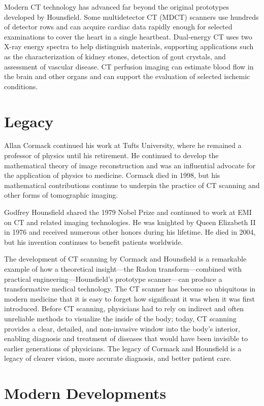 Modern CT technology has advanced far beyond the original prototypes developed by Hounsfield. Some multidetector CT (MDCT) scanners use hundreds of detector rows and can acquire cardiac data rapidly enough for selected examinations to cover the heart in a single heartbeat. Dual-energy CT uses two X-ray energy spectra to help distinguish materials, supporting applications such as the characterization of kidney stones, detection of gout crystals, and assessment of vascular disease. CT perfusion imaging can estimate blood flow in the brain and other organs and can support the evaluation of selected ischemic conditions.

\section{Legacy}

Allan Cormack continued his work at Tufts University, where he remained a professor of physics until his retirement. He continued to develop the mathematical theory of image reconstruction and was an influential advocate for the application of physics to medicine. Cormack died in 1998, but his mathematical contributions continue to underpin the practice of CT scanning and other forms of tomographic imaging.

Godfrey Hounsfield shared the 1979 Nobel Prize and continued to work at EMI on CT and related imaging technologies. He was knighted by Queen Elizabeth II in 1976 and received numerous other honors during his lifetime. He died in 2004, but his invention continues to benefit patients worldwide.

The development of CT scanning by Cormack and Hounsfield is a remarkable example of how a theoretical insight---the Radon transform---combined with practical engineering---Hounsfield's prototype scanner---can produce a transformative medical technology. The CT scanner has become so ubiquitous in modern medicine that it is easy to forget how significant it was when it was first introduced. Before CT scanning, physicians had to rely on indirect and often unreliable methods to visualize the inside of the body; today, CT scanning provides a clear, detailed, and non-invasive window into the body's interior, enabling diagnosis and treatment of diseases that would have been invisible to earlier generations of physicians. The legacy of Cormack and Hounsfield is a legacy of clearer vision, more accurate diagnosis, and better patient care.


\section{Modern Developments}

